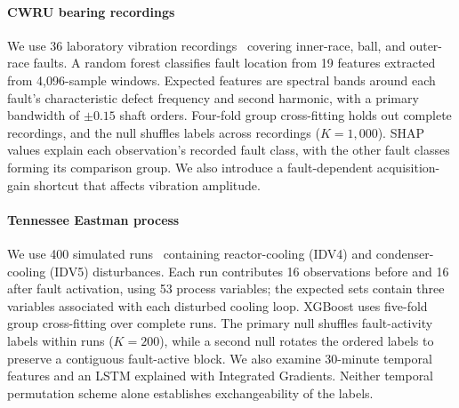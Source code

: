 \documentclass[conference]{IEEEtran}
\begin{document}
\paragraph{CWRU bearing recordings}
We use 36 laboratory vibration recordings~\cite{cwru_data} covering inner-race, ball, and outer-race faults. A random forest classifies fault location from 19 features extracted from 4{,}096-sample windows. Expected features are spectral bands around each fault's characteristic defect frequency and second harmonic, with a primary bandwidth of $\pm0.15$ shaft orders. Four-fold group cross-fitting holds out complete recordings, and the null shuffles labels across recordings ($K=1{,}000$). SHAP values explain each observation's recorded fault class, with the other fault classes forming its comparison group. We also introduce a fault-dependent acquisition-gain shortcut that affects vibration amplitude.

\paragraph{Tennessee Eastman process}
We use 400 simulated runs~\cite{reinartz2021tep} containing reactor-cooling (IDV4) and condenser-cooling (IDV5) disturbances. Each run contributes 16 observations before and 16 after fault activation, using 53 process variables; the expected sets contain three variables associated with each disturbed cooling loop. XGBoost uses five-fold group cross-fitting over complete runs. The primary null shuffles fault-activity labels within runs ($K=200$), while a second null rotates the ordered labels to preserve a contiguous fault-active block. We also examine 30-minute temporal features and an LSTM explained with Integrated Gradients. Neither temporal permutation scheme alone establishes exchangeability of the labels.




\end{document}
